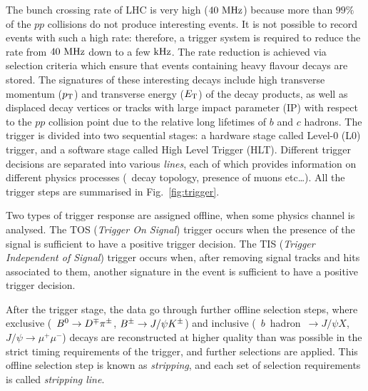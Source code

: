 The bunch crossing rate of LHC is very high ($40~\rm MHz$) because more than $99\%$ of the $pp$ collisions do not produce interesting events. It is not possible to record events with such a high rate: therefore, a trigger system \cite{Trigger} is required to reduce the rate from $40~\rm MHz$ down to a few $\rm kHz$. The rate reduction is achieved via selection criteria which ensure that events containing heavy flavour decays are stored. The signatures of these interesting decays include high transverse momentum ($\mbox{$p_{\rm T}$}$) and transverse energy ($E_{\rm T}$) of the decay products, as well as displaced decay vertices 
or tracks with large impact parameter (IP) with respect to the $pp$ collision point due to the relative long lifetimes of $b$ and $c$ hadrons. The trigger is divided into two sequential stages: a hardware stage called Level-0 (L0) trigger, and a software stage called High Level Trigger (HLT). Different trigger decisions are separated into various \emph{lines}, each of which provides information on different physics processes (\eg~decay topology, presence of muons etc\dots). All the trigger steps are summarised in Fig.~\ref{fig:trigger}.

Two types of trigger response are assigned offline, when some physics channel is analysed. The TOS (\emph{Trigger On Signal}) trigger occurs when the presence of the signal is sufficient to have a positive trigger decision. The TIS (\emph{Trigger Independent of Signal}) trigger occurs when, after removing signal tracks and hits associated to them, another signature in the event is sufficient to have a positive trigger decision.

After the trigger stage, the data go through further offline selection steps, where exclusive (\eg~$B^0\rightarrow D^\mp\pi^\pm$, $B^\pm\rightarrow J/\psi K^{\pm}$) and inclusive (\eg~$b$~hadron~$\to J/\psi X$, $J/\psi\to\mu^+\mu^-$) decays are reconstructed at higher quality than was possible in the strict timing requirements of the trigger, and further selections are applied.
This offline selection step is known as \emph{stripping}, and each set of selection requirements is called \emph{stripping line}.

